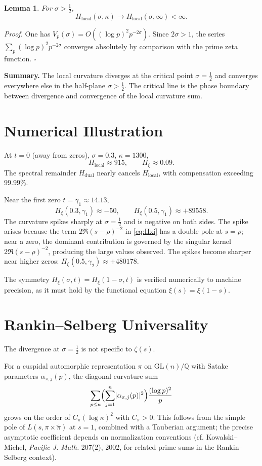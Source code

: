 \documentclass[11pt]{article}
\newtheorem*{lemma*}{Lemma}
\begin{document}
\begin{lemma*}
For $\sigma>\tfrac12$,
\[
H_{\mathrm{local}}(\sigma,\kappa)\to H_{\mathrm{local}}(\sigma,\infty)<\infty.
\]
\end{lemma*}

\textit{Proof.} One has $V_p(\sigma)=O((\log p)^2 p^{-2\sigma})$. Since $2\sigma>1$, the series $\sum_p (\log p)^2 p^{-2\sigma}$ converges absolutely by comparison with the prime zeta function. \hfill$\square$

\medskip
\textbf{Summary.} The local curvature diverges at the critical point $\sigma=\tfrac12$ and converges everywhere else in the half-plane $\sigma>\tfrac12$. The critical line is the phase boundary between divergence and convergence of the local curvature sum.

\section{Numerical Illustration}

At $t=0$ (away from zeros), $\sigma=0.3$, $\kappa=1300$,
\[
H_{\mathrm{local}}\approx 915,
\qquad
H_{\xi}\approx 0.09.
\]
The spectral remainder $H_{\mathrm{dual}}$ nearly cancels $H_{\mathrm{local}}$, with compensation exceeding $99.99\%$.

Near the first zero $t=\gamma_1\approx 14.13$,
\[
H_{\xi}(0.3,\gamma_1)\approx -50,
\qquad
H_{\xi}(0.5,\gamma_1)\approx +89558.
\]
The curvature spikes sharply at $\sigma=\tfrac12$ and is negative on both sides. The spike arises because the term $2\Re (s-\rho)^{-2}$ in \eqref{eq:Hxi} has a double pole at $s=\rho$; near a zero, the dominant contribution is governed by the singular kernel $2\Re (s-\rho)^{-2}$, producing the large values observed. The spikes become sharper near higher zeros: $H_{\xi}(0.5,\gamma_2)\approx +480178$.

The symmetry $H_{\xi}(\sigma,t)=H_{\xi}(1-\sigma,t)$ is verified numerically to machine precision, as it must hold by the functional equation $\xi(s)=\xi(1-s)$.

\section{Rankin--Selberg Universality}

The divergence at $\sigma=\tfrac12$ is not specific to $\zeta(s)$.

For a cuspidal automorphic representation $\pi$ on $\mathrm{GL}(n)/\mathbb{Q}$ with Satake parameters $\alpha_{\pi,j}(p)$, the diagonal curvature sum
\[
\sum_{p\le \kappa}\Bigl(\sum_{j=1}^{n}\lvert \alpha_{\pi,j}(p)\rvert^2\Bigr)\frac{(\log p)^2}{p}
\]
grows on the order of $C_{\pi}(\log \kappa)^2$ with $C_{\pi}>0$. This follows from the simple pole of $L(s,\pi\times\tilde{\pi})$ at $s=1$, combined with a Tauberian argument; the precise asymptotic coefficient depends on normalization conventions (cf. Kowalski--Michel, \emph{Pacific J. Math.} 207(2), 2002, for related prime sums in the Rankin--Selberg context).
\end{document}
